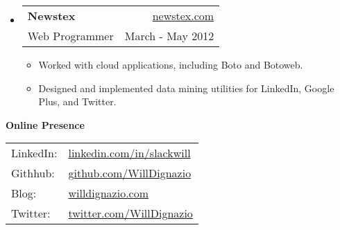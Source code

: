 \documentclass[letterpaper,11pt]{article}
\makeatletter
\newcommand{\resheading}[1]{{\large \colorbox{mygrey}{\begin{minipage}{\textwidth}{\textbf{#1 \vphantom{p\^{E}}}}\end{minipage}}}}
\newcommand{\ressubheading}[4]{
\begin{tabular*}{6.5in}{l@{\extracolsep{\fill}}r}
		\textbf{#1} & #2 \\
		{#3} & {#4} \\
\end{tabular*}\vspace{-6pt}}
\makeatother
\begin{document}
{\begin{itemize}
{\begin{itemize}
					\item{Handled software maintenance and feature tickets for in house applications}
					\item{Dealt with critical data, and university requirements}
				\end{itemize}
			}
		\item	
			\ressubheading{Newstex}{\href{http://www.newstex.com/}{newstex.com}}{Web Programmer}{March - May 2012} 
				{ \footnotesize 
				\begin{itemize}
					\item{Worked with cloud applications, including Boto and Botoweb.}
					\item{Designed and implemented data mining utilities for LinkedIn, Google Plus, and Twitter.}
				\end{itemize}
				}	
	\end{itemize}  %
}

\resheading{Online Presence}
{
	\begin{tabularx}{2in}{XX}
		LinkedIn: & \href{http://www.linkedin.com/in/slackwill/}{linkedin.com/in/slackwill} \\
		Githhub: & \href{http://www.github.com/WillDignazio}{github.com/WillDignazio} \\
		Blog: & \href{http://www.willdignazio.com/}{willdignazio.com} \\
		Twitter: & \href{https://twitter.com/WillDignazio}{twitter.com/WillDignazio} \\
	\end{tabularx}
}
\pagebreak
\end{document}
